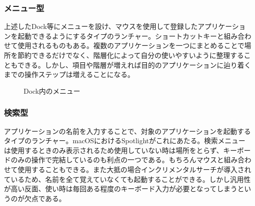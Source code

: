 \subsubsection{メニュー型}

上述したDock等にメニューを設け、マウスを使用して登録したアプリケーションを起動できるようにするタイプのランチャー。ショートカットキーと組み合わせて使用されるものもある。複数のアプリケーションを一つにまとめることで場所を節約できるだけでなく、階層化によって自分の使いやすいように整理することもできる。しかし、項目や階層が増えれば目的のアプリケーションに辿り着くまでの操作ステップは増えることになる。

\newpage

\begin{figure}[h]
    \begin{center}
    \end{center}
    \caption{Dock内のメニュー}
    \label{fig:menu}
\end{figure}

\subsubsection{検索型}

アプリケーションの名前を入力することで、対象のアプリケーションを起動するタイプのランチャー。macOSにおけるSpotlightがこれにあたる。検索メニューは使用するときのみ表示されるため使用していない時は場所をとらず、キーボードのみの操作で完結しているのも利点の一つである。もちろんマウスと組み合わせて使用することもできる。また大抵の場合インクリメンタルサーチが導入されているため、名前を全て覚えていなくても起動することができる。しかし汎用性が高い反面、使い時は毎回ある程度のキーボード入力が必要となってしまうというのが欠点である。

